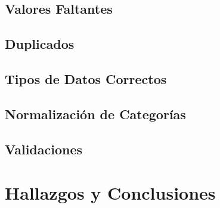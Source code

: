 
\subsection{Valores Faltantes}

\subsection{Duplicados}

\subsection{Tipos de Datos Correctos}

\subsection{Normalización de Categorías}

\subsection{Validaciones}


\section{Hallazgos y Conclusiones}